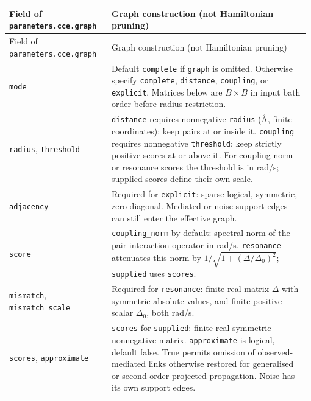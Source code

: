 \documentclass[11pt,a4paper]{article}
\newcommand{\code}[1]{\texttt{#1}}
\begin{document}
\begingroup\small
\begin{longtable}{@{}>{\raggedright\arraybackslash}p{0.335\linewidth}@{\hspace{0.025\linewidth}}>{\raggedright\arraybackslash}p{0.64\linewidth}@{}}
\toprule
Field of \code{parameters.cce.graph} & Graph construction (not Hamiltonian pruning)\\
\midrule\endfirsthead
\toprule
Field of \code{parameters.cce.graph} & Graph construction (not Hamiltonian pruning)\\
\midrule\endhead
\midrule\endfoot
\bottomrule\endlastfoot
\code{mode} & Default \code{complete} if \code{graph} is omitted. Otherwise specify \code{complete}, \code{distance}, \code{coupling}, or \code{explicit}. Matrices below are $B\times B$ in input bath order before radius restriction.\\
\code{radius}, \code{threshold} & \code{distance} requires nonnegative \code{radius} (\AA{}, finite coordinates); keep pairs at or inside it. \code{coupling} requires nonnegative \code{threshold}; keep strictly positive scores at or above it. For coupling-norm or resonance scores the threshold is in rad/s; supplied scores define their own scale.\\
\code{adjacency} & Required for \code{explicit}: sparse logical, symmetric, zero diagonal. Mediated or noise-support edges can still enter the effective graph.\\
\code{score} & \code{coupling\_norm} by default: spectral norm of the pair interaction operator in rad/s. \code{resonance} attenuates this norm by $1/\sqrt{1+(\Delta/\Delta_0)^2}$; \code{supplied} uses \code{scores}.\\
\code{mismatch}, \code{mismatch\_scale} & Required for \code{resonance}: finite real matrix $\Delta$ with symmetric absolute values, and finite positive scalar $\Delta_0$, both rad/s.\\
\code{scores}, \code{approximate} & \code{scores} for \code{supplied}: finite real symmetric nonnegative matrix. \code{approximate} is logical, default false. True permits omission of observed-mediated links otherwise restored for generalised or second-order projected propagation. Noise has its own support edges.\\
\end{longtable}
\endgroup
\end{document}
